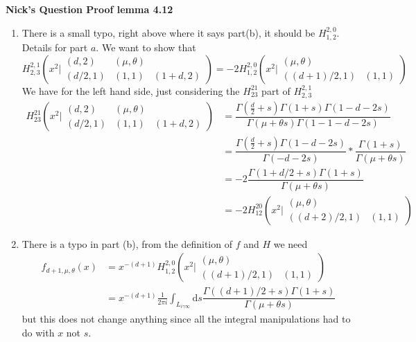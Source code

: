\documentclass[a4paper,11pt]{article}
\numberwithin{equation}{section}
\theoremstyle{plain}
\theoremstyle{definition}
\newcommand{\ud}{\ensuremath{\mathrm{d}}}
\newcounter{NQ}
\newenvironment{NickQuestion}[1][] %
{\refstepcounter{NQ}
	\begin{mdframed}[backgroundcolor=lightgray]\textbf{Nick's Question \theNQ \: #1~~}~~~\noindent}%
	{\end{mdframed}}
\numberwithin{NQ}{section}
\numberwithin{LQ}{section}
\numberwithin{ZQ}{section}
\begin{document}
\begin{NickQuestion}[Proof lemma 4.12]
	\begin{enumerate}
		\item There is a small typo, right above where it says part(b), it should be $H^{2,0}_{1,2}$. Details for part $a$. We want to show that
		\[
			H^{2,1}_{2,3}\left(x^2 \bigg\vert \begin{matrix} (d,2) & (\mu,\theta) &
			\\ (d/2,1) & (1,1) & (1+d,2) \end{matrix} \right) = -2 H^{2,0}_{1,2}\left(x^2 \bigg\vert \begin{matrix} (\mu,\theta) &
			\\ ((d+1)/2,1) & (1,1)  \end{matrix} \right) 
		\]
		We have for the left hand side, just considering the $H^{21}_{23}$ part of $H^{2,1}_{2,3}$
			\begin{align*}
	H^{21}_{23}\left(x^2 \bigg\vert \begin{matrix} (d,2) & (\mu,\theta) &
	\\ (d/2,1) & (1,1) & (1+d,2) \end{matrix} \right) &= \dfrac{\Gamma(\frac{d}{2}+s)\Gamma(1+s)\Gamma(1-d-2s)}{\Gamma(\mu+\theta s)\Gamma(1-1-d-2s)}
	\\&= \dfrac{\Gamma(\frac{d}{2}+s)\Gamma(1-d-2s)}{\Gamma(-d-2s)} * \dfrac{\Gamma(1+s)}{\Gamma(\mu+\theta s)}
	\\&= -2\dfrac{\Gamma(1+d/2+s)\Gamma(1+s)}{\Gamma(\mu+\theta s)}
	\\& = -2H^{20}_{12}\left(x^2 \bigg\vert \begin{matrix} (\mu,\theta) &
	\\ ((d+2)/2,1) & (1,1)  \end{matrix} \right)
			\end{align*}
			
	\item There is a typo in part (b), from the definition of $f$ and $H$ we need 
	\begin{align*}
		f_{d+1,\mu,\theta}(x) &= x^{-(d+1)} H^{2,0}_{1,2}\left(x^2 \bigg\vert \begin{matrix} (\mu,\theta) &
		\\ ((d+1)/2,1) & (1,1)  \end{matrix} \right) 
		\\ & =  x^{-(d+1)} \frac{1}{2 \pi i} \int_{L_{i \gamma \infty}}\ud s \dfrac{\Gamma((d+1)/2+s)\Gamma(1+s)}{\Gamma(\mu + \theta s)}
	\end{align*}
	but this does not change anything since all the integral manipulations had to do with $x$ not $s$. 
	\end{enumerate}
\end{NickQuestion}
\end{document}
